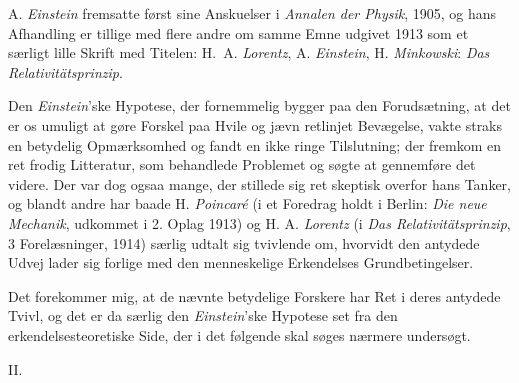 \documentclass[12pt,a4paper]{article}
\begin{document}
A. \emph{Einstein} fremsatte først sine Anskuelser i \emph{Annalen der
Physik}, 1905, og hans Afhandling er tillige med flere andre om samme Emne
udgivet 1913 som et særligt lille Skrift med Titelen: H.\ A. \emph{Lorentz},
A. \emph{Einstein}, H. \emph{Minkowski}: \emph{Das Relativitätsprinzip}.

Den \emph{Einstein}'ske Hypotese, der fornemmelig bygger paa den
Forudsætning, at det er os umuligt at gøre Forskel paa Hvile og jævn retlinjet
Bevægelse, vakte straks en betydelig Opmærksomhed og fandt en ikke ringe
Tilslutning; der fremkom en ret frodig Litteratur, som behandlede Problemet og
søgte at gennemføre det videre. Der var dog ogsaa mange, der stillede sig ret
skeptisk overfor hans Tanker, og blandt andre har baade H. \emph{Poincaré} (i
et Foredrag holdt i Berlin: \emph{Die neue Mechanik}, udkommet i 2. Oplag
1913) og H. A. \emph{Lorentz} (i \emph{Das Relativitätsprinzip}, 3
Forelæsninger, 1914) særlig udtalt sig tvivlende om, hvorvidt den antydede
Udvej lader sig forlige med den menneskelige Erkendelses Grundbetingelser.

Det forekommer mig, at de nævnte betydelige Forskere har Ret i deres antydede
Tvivl, og det er da særlig den \emph{Einstein}'ske Hypotese set fra den
erkendelsesteoretiske Side, der i det følgende skal søges nærmere undersøgt.

\begin{center}
II.
\end{center}
\end{document}
